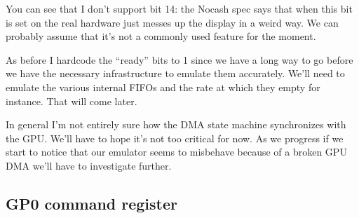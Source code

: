 \documentclass[a4paper]{article}
\begin{document}
You can see that I don't support bit 14: the Nocash spec says that
when this bit is set on the real hardware just messes up the display
in a weird way. We can probably assume that it's not a commonly used
feature for the moment.

As before I hardcode the ``ready'' bits to 1 since we have a long way
to go before we have the necessary infrastructure to emulate them
accurately. We'll need to emulate the various internal FIFOs and the
rate at which they empty for instance. That will come later.

In general I'm not entirely sure how the DMA state machine
synchronizes with the GPU. We'll have to hope it's not too critical
for now. As we progress if we start to notice that our emulator seems
to misbehave because of a broken GPU DMA we'll have to investigate
further.

\subsection{GP0 command register}

\newpage

\listoftables
\end{document}
